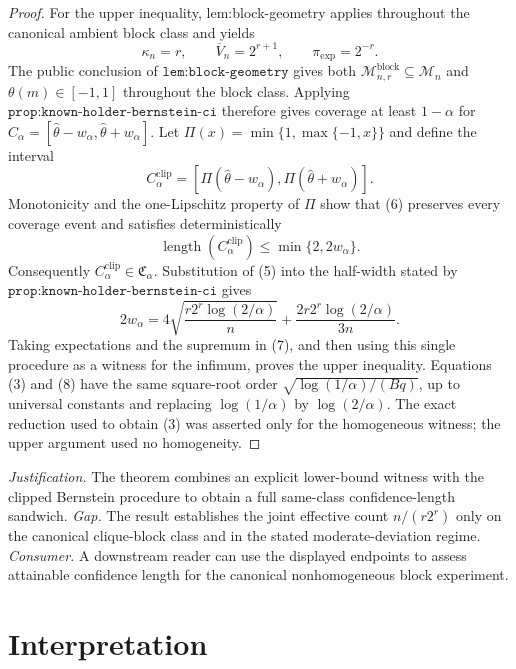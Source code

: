 \documentclass{article}
\begin{document}
\begin{proof}
For the upper inequality, lem:block-geometry applies throughout the canonical ambient block class and yields
\[
\kappa_n=r,\qquad \overline V_n=2^{r+1},\qquad \pi_{\exp}=2^{-r}. \tag{5}
\]
The public conclusion of \(\texttt{lem:block-geometry}\) gives both \(\mathcal M_{n,r}^{\mathrm{block}}\subseteq\mathcal M_n\) and \(\theta(m)\in[-1,1]\) throughout the block class. Applying \(\texttt{prop:known-holder-bernstein-ci}\) therefore gives coverage at least \(1-\alpha\) for \(C_\alpha=[\widehat\theta-w_\alpha,\widehat\theta+w_\alpha]\). Let \(\Pi(x)=\min\{1,\max\{-1,x\}\}\) and define the interval
\[
C_\alpha^{\mathrm{clip}}=[\Pi(\widehat\theta-w_\alpha),\Pi(\widehat\theta+w_\alpha)]. \tag{6}
\]
Monotonicity and the one-Lipschitz property of \(\Pi\) show that (6) preserves every coverage event and satisfies deterministically
\[
\operatorname{length}(C_\alpha^{\mathrm{clip}})\le\min\{2,2w_\alpha\}. \tag{7}
\]
Consequently \(C_\alpha^{\mathrm{clip}}\in\mathfrak C_\alpha\). Substitution of (5) into the half-width stated by \(\texttt{prop:known-holder-bernstein-ci}\) gives
\[
2w_\alpha=4\sqrt{\frac{r2^r\log(2/\alpha)}n}+\frac{2r2^r\log(2/\alpha)}{3n}. \tag{8}
\]
Taking expectations and the supremum in (7), and then using this single procedure as a witness for the infimum, proves the upper inequality. Equations (3) and (8) have the same square-root order \(\sqrt{\log(1/\alpha)/(Bq)}\), up to universal constants and replacing \(\log(1/\alpha)\) by \(\log(2/\alpha)\). The exact reduction used to obtain (3) was asserted only for the homogeneous witness; the upper argument used no homogeneity.
\end{proof}
\par\smallskip\noindent \textit{Justification.} The theorem combines an explicit lower-bound witness with the clipped Bernstein procedure to obtain a full same-class confidence-length sandwich. \textit{Gap.} The result establishes the joint effective count \(n/(r2^r)\) only on the canonical clique-block class and in the stated moderate-deviation regime. \textit{Consumer.} A downstream reader can use the displayed endpoints to assess attainable confidence length for the canonical nonhomogeneous block experiment.

\section{Interpretation}
\end{document}
